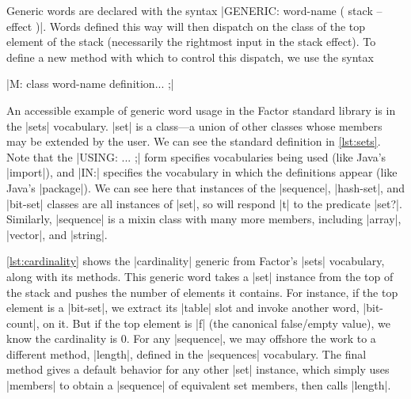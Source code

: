 Generic words are declared with the syntax
%
\factor|GENERIC: word-name ( stack -- effect )|.
%
Words defined this way will then dispatch on the class of the top element of
the stack (necessarily the rightmost input in the stack effect).  To define a
new method with which to control this dispatch, we use the syntax
%
\begin{center} \factor|M: class word-name definition... ;| \end{center}


An accessible example of generic word usage in the Factor standard library is
in the \factor|sets| vocabulary.  \factor|set| is a  class---a
union of other classes whose members may be extended by the user.  We can see
the standard definition in \vref{lst:sets}.  Note that the
%
\factor|USING: ...  ;|
%
form specifies vocabularies being used (like Java's |import|), and
\factor|IN:| specifies the vocabulary in which the definitions appear (like
Java's |package|).  We can see here that instances of the
\factor|sequence|, \factor|hash-set|, and \factor|bit-set| classes are all
instances of \factor|set|, so will respond \factor|t| to the predicate
\factor|set?|.  Similarly, \factor|sequence| is a mixin class with many more
members, including \factor|array|, \factor|vector|, and \factor|string|.


\vref{lst:cardinality} shows the \factor|cardinality| generic from Factor's
\factor|sets| vocabulary, along with its methods.  This generic word takes a
\factor|set| instance from the top of the stack and pushes the number of
elements it contains.  For instance, if the top element is a \factor|bit-set|,
we extract its \factor|table| slot and invoke another word, \factor|bit-count|,
on it.  But if the top element is \factor|f| (the canonical false/empty value),
we know the cardinality is $0$.  For any \factor|sequence|, we may offshore the
work to a different method, \factor|length|, defined in the \factor|sequences|
vocabulary.  The final method gives a default behavior for any other
\factor|set| instance, which simply uses \factor|members| to obtain a
\factor|sequence| of equivalent set members, then calls \factor|length|.

